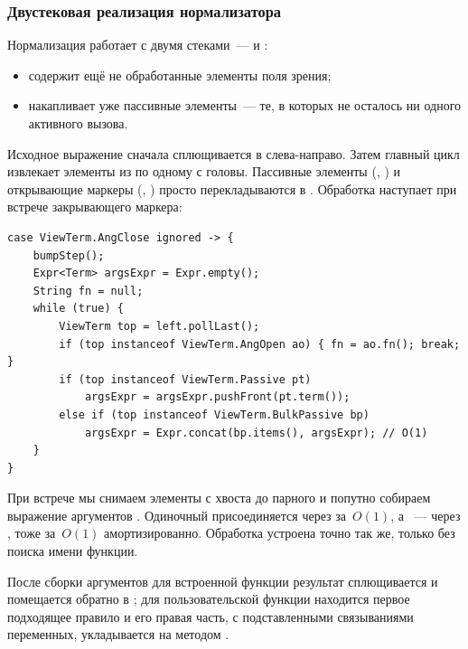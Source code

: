 \subsubsection{Двустековая реализация нормализатора}

Нормализация работает с двумя стеками~---  и :
\begin{itemize}
  \item {} содержит ещё не обработанные элементы поля зрения;
  \item {} накапливает уже пассивные элементы~--- те, в которых
        не осталось ни одного активного вызова.
\end{itemize}

Исходное выражение сначала сплющивается в  слева-направо.
Затем главный цикл извлекает элементы из  по одному с головы.
Пассивные элементы (, ) и открывающие
маркеры (, ) просто перекладываются в
. Обработка наступает при встрече закрывающего маркера:

\begin{longlisting}
\caption{Обработка закрывающего маркера вызова функции}\label{lst:angclose}
\begin{verbatim}
case ViewTerm.AngClose ignored -> {
    bumpStep();
    Expr<Term> argsExpr = Expr.empty();
    String fn = null;
    while (true) {
        ViewTerm top = left.pollLast();
        if (top instanceof ViewTerm.AngOpen ao) { fn = ao.fn(); break; }
        if (top instanceof ViewTerm.Passive pt)
            argsExpr = argsExpr.pushFront(pt.term());
        else if (top instanceof ViewTerm.BulkPassive bp)
            argsExpr = Expr.concat(bp.items(), argsExpr); // O(1)
    }
}
\end{verbatim}
\end{longlisting}

При встрече  мы снимаем элементы с хвоста 
до парного  и попутно собираем выражение аргументов
. Одиночный  присоединяется через
 за~$O(1)$, а ~--- через
, тоже за~$O(1)$
амортизированно. Обработка  устроена точно так же,
только без поиска имени функции.

После сборки аргументов для встроенной функции результат сплющивается и
помещается обратно в ; для пользовательской функции находится
первое подходящее правило и его правая часть, с подставленными связываниями
переменных, укладывается на  методом
.

